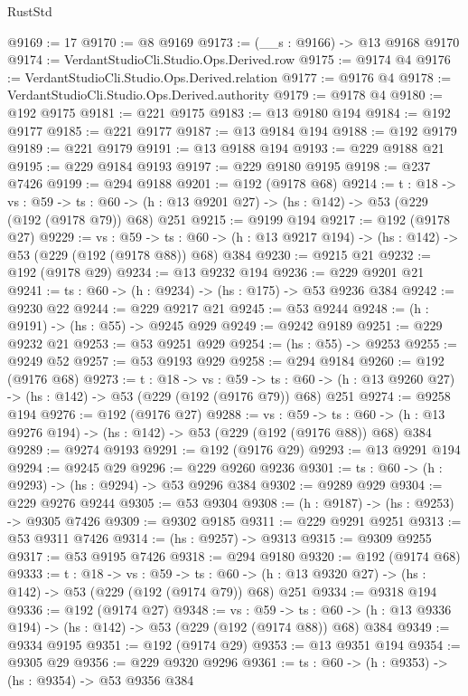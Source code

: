 \begin{lexlean}{RustStd}
\begin{coremodule}
@9169 := 17
@9170 := @8 @9169
@9173 := (__s : @9166) -> @13 @9168 @9170
@9174 := VerdantStudioCli.Studio.Ops.Derived.row
@9175 := @9174 @4
@9176 := VerdantStudioCli.Studio.Ops.Derived.relation
@9177 := @9176 @4
@9178 := VerdantStudioCli.Studio.Ops.Derived.authority
@9179 := @9178 @4
@9180 := @192 @9175
@9181 := @221 @9175
@9183 := @13 @9180 @194
@9184 := @192 @9177
@9185 := @221 @9177
@9187 := @13 @9184 @194
@9188 := @192 @9179
@9189 := @221 @9179
@9191 := @13 @9188 @194
@9193 := @229 @9188 @21
@9195 := @229 @9184 @9193
@9197 := @229 @9180 @9195
@9198 := @237 @7426
@9199 := @294 @9188
@9201 := @192 (@9178 @68)
@9214 := {t : @18} ->
  {vs : @59} ->
  {ts : @60} -> (h : @13 @9201 @27) -> (hs : @142) -> @53 (@229 (@192 (@9178 @79)) @68) @251
@9215 := @9199 @194
@9217 := @192 (@9178 @27)
@9229 := {vs : @59} ->
  {ts : @60} -> (h : @13 @9217 @194) -> (hs : @142) -> @53 (@229 (@192 (@9178 @88)) @68) @384
@9230 := @9215 @21
@9232 := @192 (@9178 @29)
@9234 := @13 @9232 @194
@9236 := @229 @9201 @21
@9241 := {ts : @60} -> (h : @9234) -> (hs : @175) -> @53 @9236 @384
@9242 := @9230 @22
@9244 := @229 @9217 @21
@9245 := @53 @9244
@9248 := (h : @9191) -> (hs : @55) -> @9245 @929
@9249 := @9242 @9189
@9251 := @229 @9232 @21
@9253 := @53 @9251 @929
@9254 := (hs : @55) -> @9253
@9255 := @9249 @52
@9257 := @53 @9193 @929
@9258 := @294 @9184
@9260 := @192 (@9176 @68)
@9273 := {t : @18} ->
  {vs : @59} ->
  {ts : @60} -> (h : @13 @9260 @27) -> (hs : @142) -> @53 (@229 (@192 (@9176 @79)) @68) @251
@9274 := @9258 @194
@9276 := @192 (@9176 @27)
@9288 := {vs : @59} ->
  {ts : @60} -> (h : @13 @9276 @194) -> (hs : @142) -> @53 (@229 (@192 (@9176 @88)) @68) @384
@9289 := @9274 @9193
@9291 := @192 (@9176 @29)
@9293 := @13 @9291 @194
@9294 := @9245 @29
@9296 := @229 @9260 @9236
@9301 := {ts : @60} -> (h : @9293) -> (hs : @9294) -> @53 @9296 @384
@9302 := @9289 @929
@9304 := @229 @9276 @9244
@9305 := @53 @9304
@9308 := (h : @9187) -> (hs : @9253) -> @9305 @7426
@9309 := @9302 @9185
@9311 := @229 @9291 @9251
@9313 := @53 @9311 @7426
@9314 := (hs : @9257) -> @9313
@9315 := @9309 @9255
@9317 := @53 @9195 @7426
@9318 := @294 @9180
@9320 := @192 (@9174 @68)
@9333 := {t : @18} ->
  {vs : @59} ->
  {ts : @60} -> (h : @13 @9320 @27) -> (hs : @142) -> @53 (@229 (@192 (@9174 @79)) @68) @251
@9334 := @9318 @194
@9336 := @192 (@9174 @27)
@9348 := {vs : @59} ->
  {ts : @60} -> (h : @13 @9336 @194) -> (hs : @142) -> @53 (@229 (@192 (@9174 @88)) @68) @384
@9349 := @9334 @9195
@9351 := @192 (@9174 @29)
@9353 := @13 @9351 @194
@9354 := @9305 @29
@9356 := @229 @9320 @9296
@9361 := {ts : @60} -> (h : @9353) -> (hs : @9354) -> @53 @9356 @384

\end{coremodule}
\end{lexlean}

